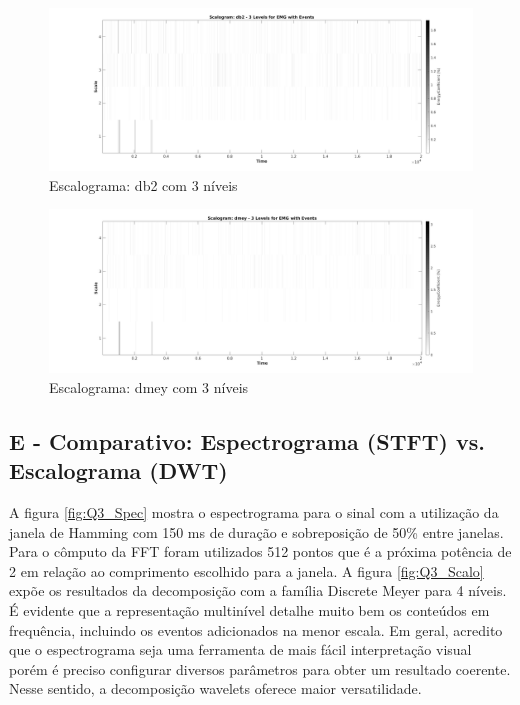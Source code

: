 \documentclass{article}
\begin{document}
\begin{figure}[H]
	\begin{center}
		\includegraphics[scale=0.25]{../Q3_Scalo_Events.png}
		\caption{Escalograma: db2 com 3 níveis}
		\label{fig:Q3_DWT}
	\end{center}
\end{figure}

\begin{figure}[H]
	\begin{center}
		\includegraphics[scale=0.25]{../Q3_Scalo_dmey.png}
		\caption{Escalograma: dmey com 3 níveis}
		\label{fig:Q3_DWT2}
	\end{center}
\end{figure}


\subsection*{E - Comparativo: Espectrograma (STFT) vs. Escalograma (DWT)}
A figura \ref{fig:Q3_Spec} mostra o espectrograma para o sinal com a utilização da janela de Hamming com 150 ms de duração e sobreposição de 50\% entre janelas. Para o cômputo da FFT foram utilizados 512 pontos que é a próxima potência de 2 em relação ao comprimento escolhido para a janela. A figura \ref{fig:Q3_Scalo} expõe os resultados da decomposição com a família Discrete Meyer para 4 níveis. É evidente que a representação multinível detalhe muito bem os conteúdos em frequência, incluindo os eventos adicionados na menor escala. Em geral, acredito que o espectrograma seja uma ferramenta de mais fácil interpretação visual porém é preciso configurar diversos parâmetros para obter um resultado coerente. Nesse sentido, a decomposição wavelets oferece maior versatilidade.
\end{document}
